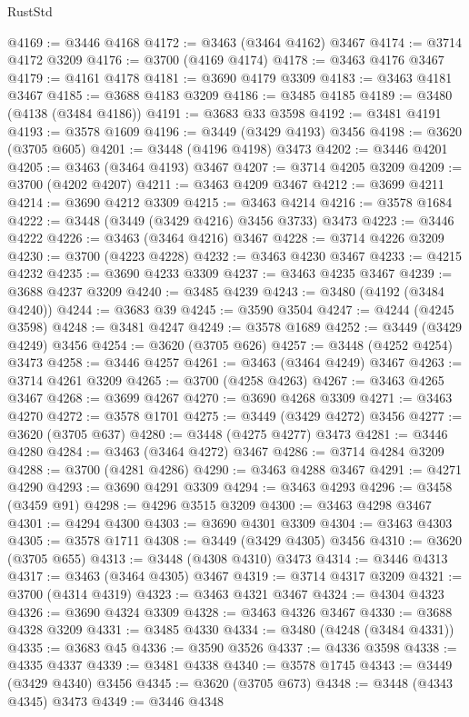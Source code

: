 \begin{lexlean}{RustStd}
\begin{coremodule}
{\begin{coremodule}
{{{{{{{{{{{{{{{{{{{{{{{{{{{{{{{{{{{{{{{{{{{{{{{{{{{{{{{{{{{{{{{{{{{{{{{{{{{{{{{{{{{{{@4169 := @3446 @4168
@4172 := @3463 (@3464 @4162) @3467
@4174 := @3714 @4172 @3209
@4176 := @3700 (@4169 @4174)
@4178 := @3463 @4176 @3467
@4179 := @4161 @4178
@4181 := @3690 @4179 @3309
@4183 := @3463 @4181 @3467
@4185 := @3688 @4183 @3209
@4186 := @3485 @4185
@4189 := @3480 (@4138 (@3484 @4186))
@4191 := @3683 @33 @3598
@4192 := @3481 @4191
@4193 := @3578 @1609
@4196 := @3449 (@3429 @4193) @3456
@4198 := @3620 (@3705 @605)
@4201 := @3448 (@4196 @4198) @3473
@4202 := @3446 @4201
@4205 := @3463 (@3464 @4193) @3467
@4207 := @3714 @4205 @3209
@4209 := @3700 (@4202 @4207)
@4211 := @3463 @4209 @3467
@4212 := @3699 @4211
@4214 := @3690 @4212 @3309
@4215 := @3463 @4214
@4216 := @3578 @1684
@4222 := @3448 (@3449 (@3429 @4216) @3456 @3733) @3473
@4223 := @3446 @4222
@4226 := @3463 (@3464 @4216) @3467
@4228 := @3714 @4226 @3209
@4230 := @3700 (@4223 @4228)
@4232 := @3463 @4230 @3467
@4233 := @4215 @4232
@4235 := @3690 @4233 @3309
@4237 := @3463 @4235 @3467
@4239 := @3688 @4237 @3209
@4240 := @3485 @4239
@4243 := @3480 (@4192 (@3484 @4240))
@4244 := @3683 @39
@4245 := @3590 @3504
@4247 := @4244 (@4245 @3598)
@4248 := @3481 @4247
@4249 := @3578 @1689
@4252 := @3449 (@3429 @4249) @3456
@4254 := @3620 (@3705 @626)
@4257 := @3448 (@4252 @4254) @3473
@4258 := @3446 @4257
@4261 := @3463 (@3464 @4249) @3467
@4263 := @3714 @4261 @3209
@4265 := @3700 (@4258 @4263)
@4267 := @3463 @4265 @3467
@4268 := @3699 @4267
@4270 := @3690 @4268 @3309
@4271 := @3463 @4270
@4272 := @3578 @1701
@4275 := @3449 (@3429 @4272) @3456
@4277 := @3620 (@3705 @637)
@4280 := @3448 (@4275 @4277) @3473
@4281 := @3446 @4280
@4284 := @3463 (@3464 @4272) @3467
@4286 := @3714 @4284 @3209
@4288 := @3700 (@4281 @4286)
@4290 := @3463 @4288 @3467
@4291 := @4271 @4290
@4293 := @3690 @4291 @3309
@4294 := @3463 @4293
@4296 := @3458 (@3459 @91)
@4298 := @4296 @3515 @3209
@4300 := @3463 @4298 @3467
@4301 := @4294 @4300
@4303 := @3690 @4301 @3309
@4304 := @3463 @4303
@4305 := @3578 @1711
@4308 := @3449 (@3429 @4305) @3456
@4310 := @3620 (@3705 @655)
@4313 := @3448 (@4308 @4310) @3473
@4314 := @3446 @4313
@4317 := @3463 (@3464 @4305) @3467
@4319 := @3714 @4317 @3209
@4321 := @3700 (@4314 @4319)
@4323 := @3463 @4321 @3467
@4324 := @4304 @4323
@4326 := @3690 @4324 @3309
@4328 := @3463 @4326 @3467
@4330 := @3688 @4328 @3209
@4331 := @3485 @4330
@4334 := @3480 (@4248 (@3484 @4331))
@4335 := @3683 @45
@4336 := @3590 @3526
@4337 := @4336 @3598
@4338 := @4335 @4337
@4339 := @3481 @4338
@4340 := @3578 @1745
@4343 := @3449 (@3429 @4340) @3456
@4345 := @3620 (@3705 @673)
@4348 := @3448 (@4343 @4345) @3473
@4349 := @3446 @4348
}}}}}}}}}}}}}}}}}}}}}}}}}}}}}}}}}}}}}}}}}}}}}}}}}}}}}}}}}}}}}}}}}}}}}}}}}}}}}}}}}}}}}
\end{coremodule}}
\end{coremodule}
\end{lexlean}
